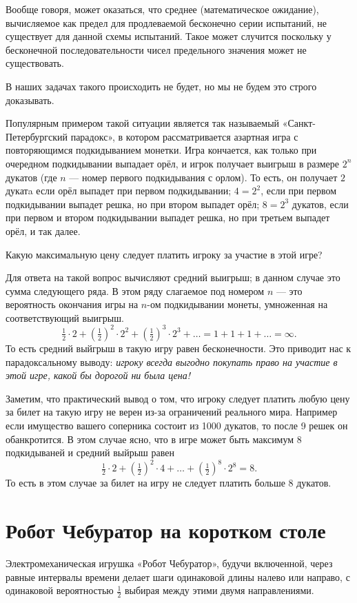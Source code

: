 \documentclass{article}
\begin{document}
Вообще говоря, может оказаться, что среднее (математическое ожидание), вычисляемое как предел для продлеваемой бесконечно серии испытаний, не существует для данной схемы испытаний.
Такое может случится поскольку у бесконечной последовательности чисел предельного значения может не существовать. 

В наших задачах такого происходить не будет,
но мы не будем это строго доказывать.

Популярным примером такой ситуации является так называемый «Санкт-Петербургский парадокс», в котором рассматривается азартная игра с повторяющимся подкидыванием монетки. 
Игра кончается, как только при очередном подкидывании выпадает орёл, и игрок получает выигрыш в размере $2^n$ дукатов 
(где $n$ --- номер первого подкидывания с орлом).
То есть, он получает $2$ дукатa если орёл выпадет при первом подкидывании; 
$4=2^2$, если при первом подкидывании выпадет решка, но при втором выпадет орёл; 
$8=2^3$ дукатов, 
если при первом и втором подкидывании выпадет решка, 
но при третьем выпадет орёл, 
и так далее. 

Какую максимальную цену следует платить игроку за участие в этой игре? 

Для ответа на такой вопрос вычисляют средний выигрыш; 
в данном случае это сумма следующего ряда.
В этом ряду слагаемое под номером $n$ 
--- это вероятность окончания игры на $n$-ом подкидывании монеты, умноженная на соответствующий выигрыш.
\[\tfrac12\cdot2+(\tfrac12)^2\cdot2^2+(\tfrac12)^3\cdot2^3+\dots=1+1+1+\dots=\infty.\]
То есть средний выйгрыш в такую игру равен бесконечности.
Это приводит нас к парадоксальному выводу: 
\emph{игроку всегда выгодно покупать право на участие в этой игре, какой бы дорогой ни была цена!}

Заметим, что практический вывод о том, что игроку следует платить любую цену за билет на такую игру не верен из-за ограничений реального мира.
Например если имущество вашего соперника состоит из 1000 дукатов,
то после 9 решек он обанкротится.
В этом случае ясно, что в игре может быть максимум 8 подкидываней
и средний выйрыш равен 
\[\tfrac12\cdot2+(\tfrac12)^2\cdot4+\dots+(\tfrac12)^8\cdot 2^8=8.\]
То есть в этом случае за билет на игру не следует платить больше 8 дукатов.


\section{Робот Чебуратор на коротком столе} 

Электромеханическая игрушка «Робот Чебуратор», 
будучи включенной, через равные интервалы времени делает шаги одинаковой длины налево или направо, с одинаковой вероятностью $\tfrac12$ выбирая между этими двумя направлениями. 
\end{document}
